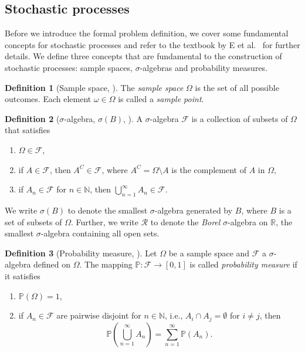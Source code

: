 \documentclass[12pt]{article}
\theoremstyle{definition}
\newtheorem{definition}[definition]{Definition}
\numberwithin{equation}{section}
\newcommand{\N}{\mathbb{N}}
\newcommand{\R}{\mathbb{R}}
\newcommand{\BP}{\mathbb{P}}
\newcommand{\CF}{\mathcal{F}}
\begin{document}
 \subsection{Stochastic processes}
 \label{subsec:stochastic_processes}
 Before we introduce the formal problem definition, we cover some fundamental concepts for stochastic processes and refer to the textbook by E et al.\ \cite{eAppliedStochasticAnalysis2021} for further details. We define three concepts that are fundamental to the construction of stochastic processes: sample spaces, $\sigma$-algebras and probability measures.
 \begin{definition}[Sample space,  ]
   The \emph{sample space} $\Omega$ is the set of all possible outcomes. Each element $\omega \in \Omega$ is called a \emph{sample point}.
 \end{definition}
 \begin{definition}[$\sigma$-algebra, $\sigma(B)$, ]
   A $\sigma$-algebra $\CF$ is a collection of subsets of $\Omega$ that satisfies
   \begin{enumerate}[label=(\roman*)]
     \item $\Omega \in \CF$,
     \item if $A \in \CF$, then $A^C \in \CF$, where $A^C = \Omega \setminus A$ is the complement of $A$ in $\Omega$,
     \item if $A_n \in \CF$ for $n \in \N$, then $\bigcup_{n=1}^{\infty} A_n \in \CF$.
   \end{enumerate}
   We write $\sigma(B)$ to denote the smallest $\sigma$-algebra generated by $B$, where $B$ is a set of subsets of $\Omega$. Further, we write $\mathcal{R}$ to denote the \emph{Borel} $\sigma$-algebra on $\R$, the smallest $\sigma$-algebra containing all open sets.
 \end{definition}
 \begin{definition}[Probability measure, ]
   Let $\Omega$ be a sample space and $\CF$ a $\sigma$-algebra defined on $\Omega$. The mapping $\BP : \CF \rightarrow [0,1]$ is called \emph{probability measure} if it satisfies
   \begin{enumerate}[label=(\roman*)]
     \item $\BP(\Omega) = 1$,
     \item if $A_n \in \CF$ are pairwise disjoint for $n\in\N$, i.e., $A_i \cap A_j = \emptyset$ for $i \neq j$, then
     \begin{equation*}
       \BP(\bigcup_{n=1}^{\infty}A_n) = \sum_{n=1}^{\infty}\BP(A_n).
     \end{equation*}
   \end{enumerate}
 \end{definition}
\end{document}

